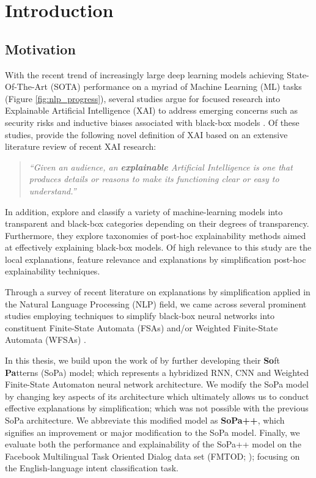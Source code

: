 \chapter{Introduction}

\label{chapter:introduction}

\section{Motivation}

With the recent trend of increasingly large deep learning models achieving State-Of-The-Art (SOTA) performance on a myriad of Machine Learning (ML) tasks (Figure \ref{fig:nlp_progress}), several studies argue for focused research into Explainable Artificial Intelligence (XAI) to address emerging concerns such as security risks and inductive biases associated with black-box models \citep{doran2017does,townsend2019extracting,danilevsky2020survey,arrieta2020explainable}. Of these studies, \citet[Section 2.2, Page 4]{arrieta2020explainable} provide the following novel definition of XAI based on an extensive literature review of recent XAI research:

\begin{quote}
  \textit{``Given an audience, an \textbf{explainable} Artificial Intelligence is one that produces details or reasons to make its functioning clear or easy to understand.''}
\end{quote}

In addition, \citet{arrieta2020explainable} explore and classify a variety of machine-learning models into transparent and black-box categories depending on their degrees of transparency. Furthermore, they explore taxonomies of post-hoc explainability methods aimed at effectively explaining black-box models. Of high relevance to this study are the local explanations, feature relevance and explanations by simplification post-hoc explainability techniques. 

Through a survey of recent literature on explanations by simplification applied in the Natural Language Processing (NLP) field, we came across several prominent studies employing techniques to simplify black-box neural networks into constituent Finite-State Automata (FSAs) and/or Weighted Finite-State Automata (WFSAs) \citep{schwartz2018sopa,peng2018rational,DBLP:journals/corr/abs-1905-08701,wang2019state,jiang2020cold}.

In this thesis, we build upon the work of \citet{schwartz2018sopa} by further developing their \textbf{So}ft \textbf{Pa}tterns (SoPa) model; which represents a hybridized RNN, CNN and Weighted Finite-State Automaton neural network architecture. We modify the SoPa model by changing key aspects of its architecture which ultimately allows us to conduct effective explanations by simplification; which was not possible with the previous SoPa architecture. We abbreviate this modified model as \textbf{SoPa++}, which signifies an improvement or major modification to the SoPa model. Finally, we evaluate both the performance and explainability of the SoPa++ model on the Facebook Multilingual Task Oriented Dialog data set (FMTOD; \citealt{schuster2018cross}); focusing on the English-language intent classification task.

